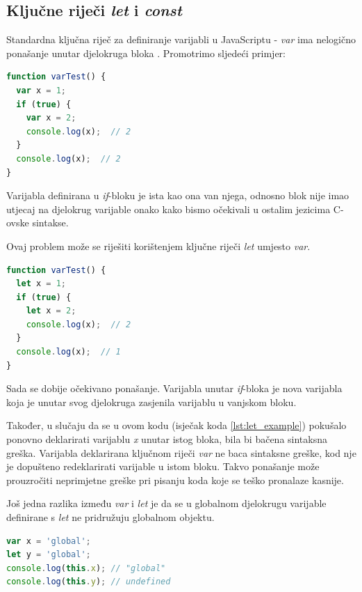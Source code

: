 \documentclass[times, utf8, zavrsni, numeric]{fer}
\newcommand{\razmakp}{\vspace{18pt}}
\newcommand{\razmaks}{\vspace{10pt}}
\begin{document}
\subsection{Ključne riječi \emph{let} i \emph{const}}

Standardna ključna riječ za definiranje varijabli u JavaScriptu - \emph{var} ima nelogično ponašanje unutar djelokruga bloka . Promotrimo sljedeći primjer:

\razmakp
\begin{lstlisting}[language=JavaScript, caption={Primjer djelokruga \emph{var} varijable}]
function varTest() {
  var x = 1;
  if (true) {
    var x = 2;
    console.log(x);  // 2
  }
  console.log(x);  // 2
}
\end{lstlisting}
\razmaks

Varijabla definirana u \emph{if}-bloku je ista kao ona van njega, odnosno blok nije imao utjecaj na djelokrug varijable onako kako bismo očekivali u ostalim jezicima C-ovske sintakse.
\razmakp

Ovaj problem može se riješiti korištenjem ključne riječi \emph{let} umjesto \emph{var}\citep{MDNLet}.

\razmakp
\begin{lstlisting}[language=JavaScript, caption={Primjer djelokruga \emph{let} varijable}, label={lst:let_example}]
function varTest() {
  let x = 1;
  if (true) {
    let x = 2;
    console.log(x);  // 2
  }
  console.log(x);  // 1
}
\end{lstlisting}
\razmaks

Sada se dobije očekivano ponašanje. Varijabla unutar \emph{if}-bloka je nova varijabla koja je unutar svog djelokruga zasjenila varijablu u vanjskom bloku.

Također, u slučaju da se u ovom kodu (isječak koda \ref{lst:let_example}) pokušalo ponovno deklarirati varijablu \emph{x} unutar istog bloka, bila bi bačena sintaksna greška.
Varijabla deklarirana ključnom riječi \emph{var} ne baca sintaksne greške, kod nje je dopušteno redeklarirati varijable u istom bloku.
Takvo ponašanje može prouzročiti neprimjetne greške pri pisanju koda koje se teško pronalaze kasnije.

\razmakp

Još jedna razlika između \emph{var} i \emph{let} je da se u globalnom djelokrugu varijable definirane s \emph{let} ne pridružuju globalnom objektu.

\razmakp
\begin{lstlisting}[language=JavaScript, caption={Odnos \emph{var} i \emph{let} s globalnim objektom}]
var x = 'global';
let y = 'global';
console.log(this.x); // "global"
console.log(this.y); // undefined
\end{lstlisting}
\razmaks
\end{document}
